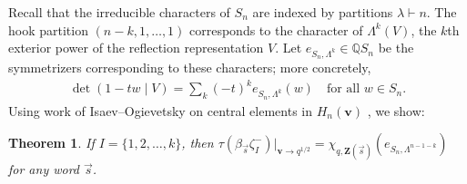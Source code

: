 \documentclass[submission]{FPSAC2025}
\newtheorem{thm}{Theorem}
\newcommand{\dfemph}[1]{\textcolor{blue}{\emph{#1}}}
\newcommand{\x}{\mathbf{v}}
\newcommand{\CharQ}[1]{\chi_{q, #1}}
\begin{document}
Recall that the irreducible characters of $S_n$ are indexed by partitions $\lambda \vdash n$.
The hook partition $(n - k, 1, \ldots, 1)$ corresponds to the character of $\Lambda^k(V)$, the $k$th exterior power of the reflection representation $V$.
Let $e_{S_n, \Lambda^k} \in \mathbb{Q}S_n$ be the symmetrizers corresponding to these characters; more concretely,
\begin{align}
\det(1 - tw \mid V) = \sum_k {(-t)^k} e_{S_n, \Lambda^k}(w)
	\quad\text{for all $w \in S_n$}.
\end{align}
Using work of Isaev--Ogievetsky on central elements in $H_n(\x)$ \cite{io}, we show:

\begin{thm}\label{thm:asc}
If $I = \{1, 2, \ldots, k\}$, then $\tau(\beta_{\vec{s}}\zeta_I^-)|_{\x \to q^{1/2}} = \CharQ{\mathbf{Z}(\vec{s})}(e_{S_n, \Lambda^{n - 1 - k}})$ for any word $\vec{s}$.
\end{thm}



\end{document}
